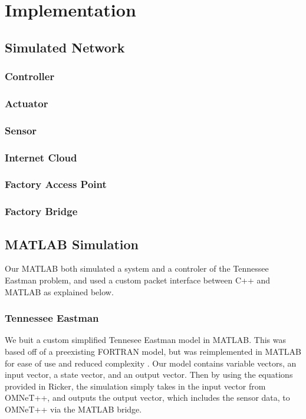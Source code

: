 \section{Implementation}
\subsection{Simulated Network}

\subsubsection{Controller}

\subsubsection{Actuator}

\subsubsection{Sensor}

\subsubsection{Internet Cloud}

\subsubsection{Factory Access Point}

\subsubsection{Factory Bridge}

\subsection{MATLAB Simulation}
  Our MATLAB both simulated a system and a controler of the
  Tennessee Eastman problem, and used a custom packet interface
  between C++ and MATLAB as explained below.

\subsubsection{Tennessee Eastman}
  We buit a custom simplified Tennesee Eastman model in MATLAB.  
  This was based off of a preexisting FORTRAN model, but was
  reimplemented in MATLAB for ease of use and reduced complexity 
  .  Our model contains variable vectors, an
  input vector, a state vector, and an output vector. Then by 
  using the equations provided in Ricker, the
  simulation simply takes in the input vector from OMNeT++, and
  outputs the output vector, which includes the sensor data, to
  OMNeT++ via the MATLAB bridge.

